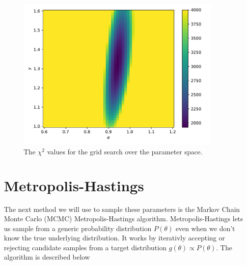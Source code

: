\documentclass{article}
\begin{document}
\begin{figure}
    \centering
    \includegraphics[width=0.9\textwidth]{figs/grid_chisq.pdf}
    \caption{The $\chi^2$ values for the grid search over the parameter space.}
    \label{fig:grid}
\end{figure}


\section{Metropolis-Hastings}
The next method we will use to sample these parameters is the Markov Chain Monte Carlo (MCMC) Metropolis-Hastings algorithm.
Metropolis-Hastings lets us sample from a generic probability distribution $P(\theta)$ even when we don't know the true underlying distribution. It works by iterativly accepting or rejecting candidate samples from a target distribution $g(\theta) \propto P(\theta)$. The algorithm is described below
\end{document}
